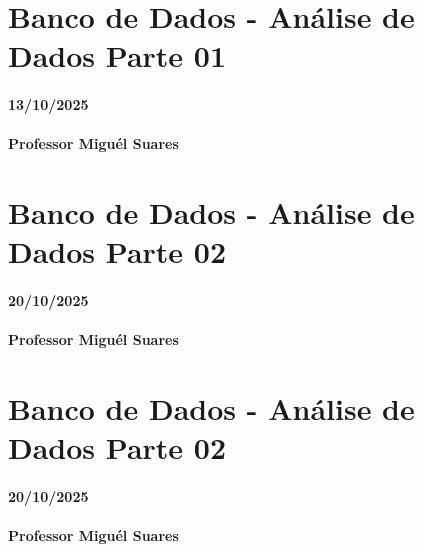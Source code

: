\documentclass[
]{book}
\begin{document}
\chapter{Banco de Dados - Análise de Dados Parte 01}\label{banco-de-dados---anuxe1lise-de-dados-parte-01-1}

\subsubsection*{13/10/2025}\label{section-16}

\subsubsection*{Professor Miguél Suares}\label{professor-miguuxe9l-suares-16}

\chapter{Banco de Dados - Análise de Dados Parte 02}\label{banco-de-dados---anuxe1lise-de-dados-parte-02}

\subsubsection*{20/10/2025}\label{section-17}

\subsubsection*{Professor Miguél Suares}\label{professor-miguuxe9l-suares-17}

\chapter{Banco de Dados - Análise de Dados Parte 02}\label{banco-de-dados---anuxe1lise-de-dados-parte-02-1}

\subsubsection*{20/10/2025}\label{section-18}

\subsubsection*{Professor Miguél Suares}\label{professor-miguuxe9l-suares-18}
\end{document}
